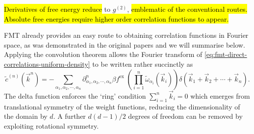 \hl{Derivatives of free energy reduce} to $g^{(2)}$,\hl{ emblematic of the conventional routes.
Absolute free energies require higher order correlation functions to appear.}

FMT already provides an easy route to obtaining correlation functions in Fourier space, as was demonstrated in the original papers \cite{RosenfeldPRL1989,RosenfeldJCP1990} and we will summarise below.
Applying the convolution theorem allows the Fourier transform of \eqref{eq:fmt-direct-correlations-uniform-density} to be written rather succinctly as
\begin{equation}
  \tilde{c}^{(n)}(\vec{k}^n)
  =
  - \sum_{\alpha_1, \alpha_2, \cdots, \alpha_n}
  \partial^n_{\alpha_1, \alpha_2, \cdots, \alpha_n} \beta f^\mathrm{ex} \;
  \left( \prod_{i=1}^n \widetilde{\omega}_{\alpha_i}(\vec{k}_i) \right)
  \delta(\vec{k}_1 + \vec{k}_2 + \cdots + \vec{k}_n).
\end{equation}
The delta function enforces the `ring' condition $\sum_{i=1}^n \vec{k}_i = 0$ which emerges from translational symmetry of the weight functions, reducing the dimensionality of the domain by $d$.
A further $d(d-1)/2$ degrees of freedom%
can be removed by exploiting rotational symmetry.
